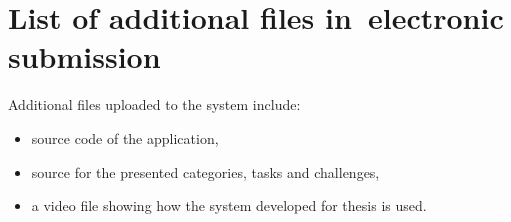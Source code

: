 \chapter{List of additional files in~electronic submission}


Additional files uploaded to the system include:
\begin{itemize}
\item source code of the application,
\item source for the presented categories, tasks and challenges,
\item a video file showing how the system developed for thesis is used.
\end{itemize}

